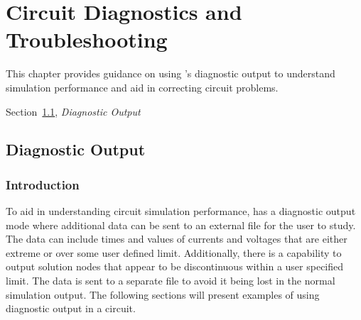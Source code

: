 

\chapter{Circuit Diagnostics and Troubleshooting}

{
This chapter provides guidance on using \Xyce{}'s diagnostic output 
to understand simulation performance and aid in correcting
circuit problems.
\begin{XyceItemize}
\item Section~\ref{DiagnosticOutput}, {\em Diagnostic Output}
\end{XyceItemize}
}

\section{Diagnostic Output}
\label{DiagnosticOutput}

\subsection{Introduction}
To aid in understanding circuit simulation performance, \Xyce{} has a diagnostic output mode
where additional data can be sent to an external file for the user to study.  The data 
can include times and values of currents and voltages that are either extreme or over some
user defined limit.  Additionally, there is a capability to output solution nodes that 
appear to be discontinuous within a user specified limit.  The data is sent to a separate
file to avoid it being lost in the normal simulation output.  The following sections will
present examples of using diagnostic output in a circuit.


